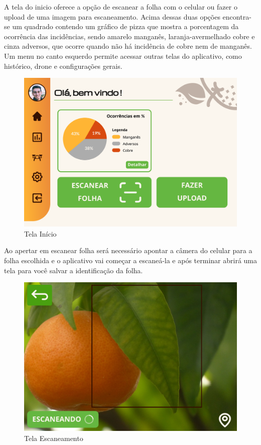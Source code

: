 \documentclass[
  a4paper,%
  12pt,%
  english,%
  brazilian,%
]{article}
\begin{document}
A tela do inicio  oferece a opção de escanear a folha com o celular ou fazer o upload de uma imagem para escaneamento. Acima dessas duas opções encontra-se um quadrado contendo um gráfico de pizza que mostra a porcentagem da ocorrência das incidências, sendo amarelo manganês, laranja-avermelhado cobre e cinza adversos, que ocorre quando não há incidência de cobre nem de manganês. Um menu no canto esquerdo permite acessar outras telas do aplicativo, como histórico, drone e configurações gerais.

\begin{figure}[H]
\centering
\caption{Tela Início}%
\label{fig:tela-inicio}
\includegraphics[width=0.8\linewidth]{Logos/tela-inicio.png}
\end{figure}

Ao apertar em escanear folha  será necessário apontar a câmera do celular para a folha escolhida e o aplicativo vai começar a escaneá-la e após terminar abrirá uma tela para você salvar a identificação da folha.


\begin{figure}[H]
\centering
\caption{Tela Escaneamento}%
\label{fig:tela-escaneamento}
\includegraphics[width=0.8\linewidth]{Logos/Tela-Escaneamento.png}
\end{figure}
\end{document}
